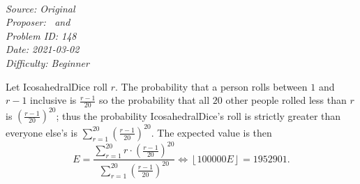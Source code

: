 \SSbreak\\
\emph{Source: Original}\\
\emph{Proposer: \Ptan\, and \Pwen}\\
\emph{Problem ID: 148}\\
\emph{Date: 2021-03-02}\\
\emph{Difficulty: Beginner}\\
\SSbreak

\bigskip

\begin{solution}\hfil\medskip
  
    Let IcosahedralDice roll $r$. The probability that a person rolls between $1$ and $r - 1$ inclusive is $\frac{r - 1}{20}$ so the probability that all $20$
    other people rolled less than $r$ is $\left(\frac{r - 1}{20}\right)^{20}$; thus the probability IcosahedralDice's roll is strictly greater than everyone else's
    is $\sum_{r = 1}^{20} \left(\frac{r - 1}{20}\right)^{20}$. The expected value is then
    $$E = \dfrac{\sum_{r = 1}^{20} r \cdot \left(\frac{r - 1}{20}\right)^{20}}{\sum_{r = 1}^{20} \left(\frac{r - 1}{20}\right)^{20}} \iff \left\lfloor 100000E \right\rfloor = \boxed{1952901}.$$
\end{solution}\bigskip
